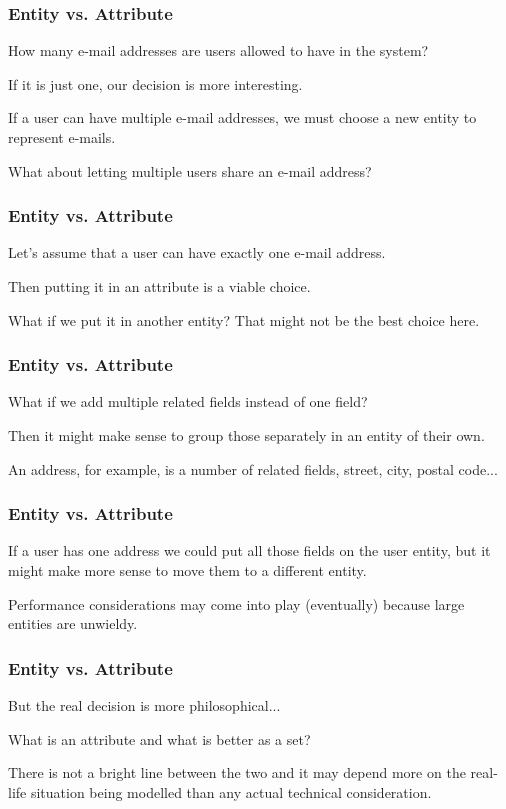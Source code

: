 \begin{frame}
\frametitle{Entity vs. Attribute}

How many e-mail addresses are users allowed to have in the system? 

If it is just one, our decision is more interesting. 

If a user can have multiple e-mail addresses, we must choose a new entity to represent e-mails. 

What about letting multiple users share an e-mail address? 

\end{frame}



\begin{frame}
\frametitle{Entity vs. Attribute}

Let's assume that a user can have exactly one e-mail address. 

Then putting it in an attribute is a viable choice. 

What if we put it in another entity? That might not be the best choice here. 

\end{frame}



\begin{frame}
\frametitle{Entity vs. Attribute}

What if we add multiple related fields instead of one field? 

Then it might make sense to group those separately in an entity of their own. 

An address, for example, is a number of related fields, street, city, postal code...

\end{frame}



\begin{frame}
\frametitle{Entity vs. Attribute}

If a user has one address we could put all those fields on the user entity, but it might make more sense to move them to a different entity. 

Performance considerations may come into play (eventually) because large entities are unwieldy. 

\end{frame}



\begin{frame}
\frametitle{Entity vs. Attribute}

But the real decision is more philosophical... 

What is an attribute and what is better as a set? 

There is not a bright line between the two and it may depend more on the real-life situation being modelled than any actual technical consideration.


\end{frame}



